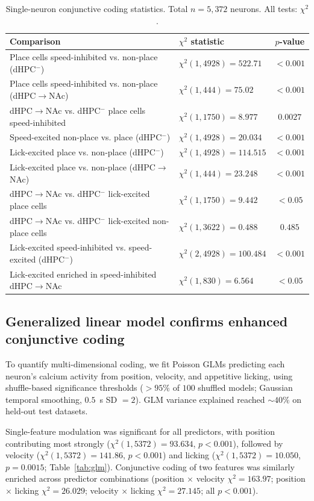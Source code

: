 \documentclass[11pt]{article}
\begin{document}
\begin{table}[H]
\centering
\caption{Single-neuron conjunctive coding statistics. Total $n=5{,}372$ neurons. All tests: $\chi^2$.}
\label{tab:conjunctive}
\begin{tabular}{llc}
\toprule
Comparison & $\chi^2$ statistic & $p$-value \\
\midrule
Place cells speed-inhibited vs. non-place (dHPC$^-$) & $\chi^2(1,4928) = 522.71$ & $<0.001$ \\
Place cells speed-inhibited vs. non-place (dHPC$\to$NAc) & $\chi^2(1,444) = 75.02$ & $<0.001$ \\
dHPC$\to$NAc vs. dHPC$^-$ place cells speed-inhibited & $\chi^2(1,1750) = 8.977$ & $0.0027$ \\
Speed-excited non-place vs. place (dHPC$^-$) & $\chi^2(1,4928) = 20.034$ & $<0.001$ \\
Lick-excited place vs. non-place (dHPC$^-$) & $\chi^2(1,4928) = 114.515$ & $<0.001$ \\
Lick-excited place vs. non-place (dHPC$\to$NAc) & $\chi^2(1,444) = 23.248$ & $<0.001$ \\
dHPC$\to$NAc vs. dHPC$^-$ lick-excited place cells & $\chi^2(1,1750) = 9.442$ & $<0.05$ \\
dHPC$\to$NAc vs. dHPC$^-$ lick-excited non-place cells & $\chi^2(1,3622) = 0.488$ & $0.485$ \\
Lick-excited speed-inhibited vs. speed-excited (dHPC$^-$) & $\chi^2(2,4928) = 100.484$ & $<0.001$ \\
Lick-excited enriched in speed-inhibited dHPC$\to$NAc & $\chi^2(1,830) = 6.564$ & $<0.05$ \\
\bottomrule
\end{tabular}
\end{table}

\subsection{Generalized linear model confirms enhanced conjunctive coding}

To quantify multi-dimensional coding, we fit Poisson GLMs predicting each neuron's calcium activity from position, velocity, and appetitive licking, using shuffle-based significance thresholds ($>95\%$ of $100$ shuffled models; Gaussian temporal smoothing, $0.5$~s SD $=2$). GLM variance explained reached $\sim 40\%$ on held-out test datasets.

Single-feature modulation was significant for all predictors, with position contributing most strongly ($\chi^2(1,5372) = 93.634$, $p<0.001$), followed by velocity ($\chi^2(1,5372) = 141.86$, $p<0.001$) and licking ($\chi^2(1,5372) = 10.050$, $p=0.0015$; Table~\ref{tab:glm}). Conjunctive coding of two features was similarly enriched across predictor combinations (position $\times$ velocity $\chi^2 = 163.97$; position $\times$ licking $\chi^2 = 26.029$; velocity $\times$ licking $\chi^2 = 27.145$; all $p<0.001$).
\end{document}
